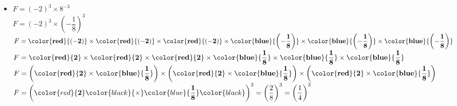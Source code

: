 \begin{itemize}
        \bigskip
        \item $F=(-2)^3\times 8^{-3}$\\
        $F=(-2)^3\times \left(-\dfrac{1}{8}\right)^3$\\
        $F=\mathbf{\color{red}{(-2)}} \times \mathbf{\color{red}{(-2)}}\times \mathbf{\color{red}{(-2)}} \times \mathbf{\color{blue}{\left(-\dfrac{1}{8}\right)}}\times \mathbf{\color{blue}{\left(-\dfrac{1}{8}\right)}}\times \mathbf{\color{blue}{\left(-\dfrac{1}{8}\right)}}$\\
        $F=\mathbf{\color{red}{2}} \times \mathbf{\color{red}{2}}\times \mathbf{\color{red}{2}} \times \mathbf{\color{blue}{\dfrac{1}{8}}}\times \mathbf{\color{blue}{\dfrac{1}{8}}}\times \mathbf{\color{blue}{\dfrac{1}{8}}}$\\
        $F=\left(\mathbf{\color{red}{2}} \times \mathbf{\color{blue}{\dfrac{1}{8}}}\right)\times \left(\mathbf{\color{red}{2}} \times \mathbf{\color{blue}{\dfrac{1}{8}}}\right)\times \left(\mathbf{\color{red}{2}} \times \mathbf{\color{blue}{\dfrac{1}{8}}}\right)$\\
        $F= \left(\color{red}{\mathbf{2}} \color{black}{\times} \color{blue}{\mathbf{\dfrac{1}{8}}}\color{black}\right)^{3}=\left(\dfrac{2}{8}\right)^3=\left(\dfrac{1}{4}\right)^3$
    \end{itemize}
